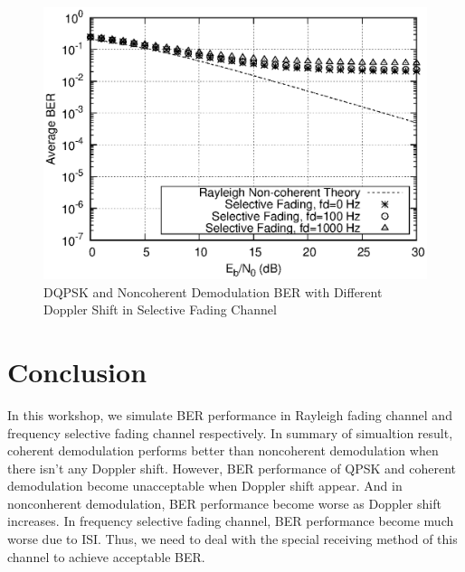 \documentclass[technicalreport]{ieicej}
\begin{document}
\begin{figure}[H]
	\begin{center}
		\vspace{0cm}
		\includegraphics[width=\linewidth,clip]{fig/select.eps}
		\caption{DQPSK and Noncoherent Demodulation BER with Different Doppler Shift in Selective Fading Channel}
		\label{fig:sample}
	\end{center}
\end{figure}

\section{Conclusion}
In this workshop, we simulate BER performance in Rayleigh fading channel and frequency selective fading channel respectively. In summary of simualtion result, coherent demodulation performs better than noncoherent demodulation when there isn't any Doppler shift. However, BER performance of QPSK and coherent demodulation become unacceptable when Doppler shift appear. And in nonconherent demodulation, BER performance become worse as Doppler shift increases. In frequency selective fading channel, BER performance become much worse due to ISI. Thus, we need to deal with the special receiving method of this channel to achieve acceptable BER.



\end{document}
